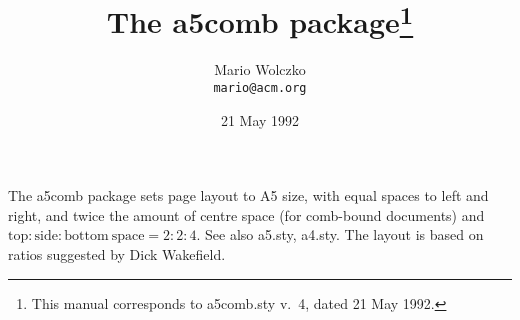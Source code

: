 \documentclass[DIV=9, fontsize=12, pagesize=auto]{scrartcl}
\title{The \textsf{a5comb} package\thanks{This manual corresponds to \textsf{a5comb.sty} v.~4, dated 21 May 1992.}}
\author{Mario Wolczko\\\texttt{mario@acm.org}}
\date{21 May 1992}
\begin{document}
\maketitle

\noindent
The \textsf{a5comb} package sets page layout to A5 size, with equal
spaces to left and right, and twice the amount of centre space
(for comb-bound documents) and $\mathrm{top}:\mathrm{side}:\mathrm{bottom~space} = 2:2:4$.
See also \textsf{a5.sty}, \textsf{a4.sty}.
The layout is based on ratios suggested by Dick Wakefield.
\end{document}
